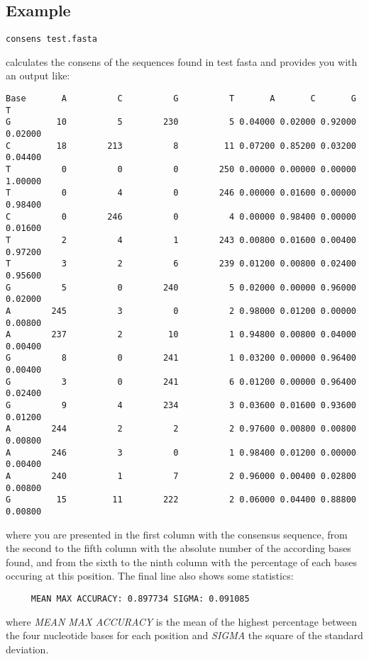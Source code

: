 \subsection{Example}
\begin{lstlisting}
consens test.fasta
\end{lstlisting}
calculates the consens of the sequences found in test fasta and
provides you with an output like:
\begin{lstlisting}
Base       A          C          G          T       A       C       G       T
G         10          5        230          5 0.04000 0.02000 0.92000 0.02000
C         18        213          8         11 0.07200 0.85200 0.03200 0.04400
T          0          0          0        250 0.00000 0.00000 0.00000 1.00000
T          0          4          0        246 0.00000 0.01600 0.00000 0.98400
C          0        246          0          4 0.00000 0.98400 0.00000 0.01600
T          2          4          1        243 0.00800 0.01600 0.00400 0.97200
T          3          2          6        239 0.01200 0.00800 0.02400 0.95600
G          5          0        240          5 0.02000 0.00000 0.96000 0.02000
A        245          3          0          2 0.98000 0.01200 0.00000 0.00800
A        237          2         10          1 0.94800 0.00800 0.04000 0.00400
G          8          0        241          1 0.03200 0.00000 0.96400 0.00400
G          3          0        241          6 0.01200 0.00000 0.96400 0.02400
G          9          4        234          3 0.03600 0.01600 0.93600 0.01200
A        244          2          2          2 0.97600 0.00800 0.00800 0.00800
A        246          3          0          1 0.98400 0.01200 0.00000 0.00400
A        240          1          7          2 0.96000 0.00400 0.02800 0.00800
G         15         11        222          2 0.06000 0.04400 0.88800 0.00800
\end{lstlisting}
where you are presented in the first column with the consensus
sequence, from the second to the fifth column with the absolute number
of the according bases found, and from the sixth to the ninth column
with the percentage of each bases occuring at this position.
The final line also shows some statistics:
\begin{lstlisting}
     MEAN MAX ACCURACY: 0.897734 SIGMA: 0.091085
\end{lstlisting}
where \emph{MEAN MAX ACCURACY} is the mean of the highest percentage
between the four nucleotide bases for each position and \emph{SIGMA} the
square of the standard deviation.


